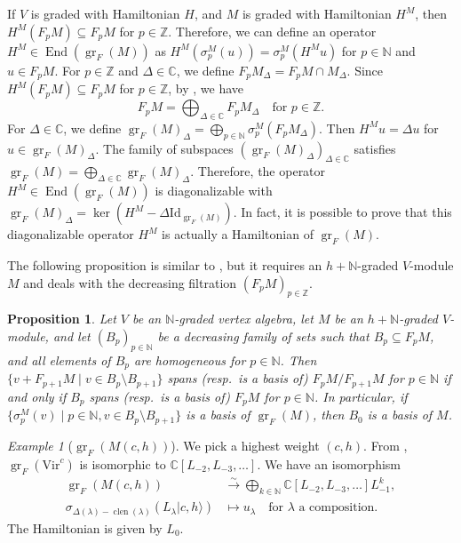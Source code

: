 \documentclass[a4paper, 12pt, reqno]{amsart}
\newtheorem{proposition}[theorem]{Proposition}
\theoremstyle{remark}
\newtheorem{example}[theorem]{Example}
\DeclareMathOperator{\clen}{clen}
\DeclareMathOperator{\gr}{gr}
\DeclareMathOperator{\End}{End}
\newcommand{\Vir}{{\mathrm{Vir}}}
\newcommand{\Id}{{\mathrm{Id}}}
\begin{document}
If $V$ is graded with Hamiltonian $H$, and $M$ is graded with Hamiltonian $H^M$, then $H^M(F_pM) \subseteq F_pM$ for $p \in \mathbb{Z}$.
Therefore, we can define an operator $H^M \in \End(\gr_F(M))$ as $H^M(\sigma^M_p(u)) = \sigma^M_p(H^Mu)$ for $p \in \mathbb{N}$ and $u \in F_pM$.
For $p \in \mathbb{Z}$ and $\Delta \in \mathbb{C}$, we define $F_pM_\Delta = F_pM \cap M_\Delta$.
Since $H^M(F_pM) \subseteq F_pM$ for $p \in \mathbb{Z}$, by \cite[Corollary 1.1]{kac_bombay_2013}, we have
\begin{equation*}
  F_pM = \bigoplus_{\Delta \in \mathbb{C}}F_pM_\Delta \quad \text{for $p \in \mathbb{Z}$}.
\end{equation*}
For $\Delta \in \mathbb{C}$, we define $\gr_F(M)_\Delta = \bigoplus_{p \in \mathbb{N}}\sigma^M_p(F_pM_\Delta)$.
Then $H^Mu = \Delta u$ for $u \in \gr_F(M)_\Delta$.
The family of subspaces $(\gr_F(M)_\Delta)_{\Delta \in \mathbb{C}}$ satisfies $\gr_F(M) = \bigoplus_{\Delta \in \mathbb{C}}\gr_F(M)_\Delta$.
Therefore, the operator $H^M \in \End(\gr_F(M))$ is diagonalizable with $\gr_F(M)_\Delta = \ker(H^M - \Delta\Id_{\gr_F(M)})$.
In fact, it is possible to prove that this diagonalizable operator $H^M$ is actually a Hamiltonian of $\gr_F(M)$.

The following proposition is similar to , but it requires an $h + \mathbb{N}$-graded $V$-module $M$ and deals with the decreasing filtration $(F_pM)_{p \in \mathbb{Z}}$.

\begin{proposition}
  \label{prp:6}
  Let $V$ be an $\mathbb{N}$-graded vertex algebra, let $M$ be an $h + \mathbb{N}$-graded $V$-module, and let $(B_p)_{p \in \mathbb{N}}$ be a decreasing family of sets such that $B_p \subseteq F_pM$, and all elements of $B_p$ are homogeneous for $p \in \mathbb{N}$.
  Then $\{v + F_{p + 1}M \mid v \in B_p \setminus B_{p + 1}\}$ spans (resp.\ is a basis of) $F_pM/F_{p + 1}M$ for $p \in \mathbb{N}$ if and only if $B_p$ spans (resp.\ is a basis of) $F_pM$ for $p \in \mathbb{N}$.
  In particular, if $\{\sigma_p^M(v) \mid p \in \mathbb{N}, v \in B_p \setminus B_{p + 1}\}$ is a basis of $\gr_F(M)$, then $B_0$ is a basis of $M$.
\end{proposition}

\begin{example}[$\gr_F(M(c, h))$]
  \label{exa:5}
  We pick a highest weight $(c, h)$.
  From , $\gr_F(\Vir^c)$ is isomorphic to $\mathbb{C}[L_{-2}, L_{-3}, \dots]$.
  We have an isomorphism
  \begin{align*}
    \gr_F(M(c, h)) &\xrightarrow{\sim} \bigoplus_{k \in \mathbb{N}}\mathbb{C}[L_{-2}, L_{-3}, \dots]L_{-1}^k, \\
    \sigma_{\Delta(\lambda) - \clen(\lambda)}(L_\lambda|c, h\rangle) &\mapsto u_\lambda \quad \text{for $\lambda$ a composition}.
  \end{align*}
  The Hamiltonian is given by $L_0$.
\end{example}
\end{document}
